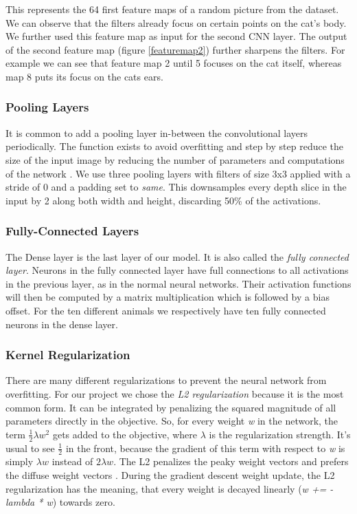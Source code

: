 \documentclass[journal]{IEEEtran}
\begin{document}
This represents the 64 first feature maps of a random picture from the dataset. We can observe that the filters already focus on certain points on the cat's body. We further used this feature map as input for the second CNN layer. The output of the second feature map (figure \ref{featuremap2}) further sharpens the filters. For example we can see that feature map 2 until 5 focuses on the cat itself, whereas map 8 puts its focus on the cats ears. \\

\subsubsection{Pooling Layers}
\noindent It is common to add a pooling layer in-between the convolutional layers periodically. The function exists to avoid overfitting and step by step reduce the size of the input image by reducing the number of parameters and computations of the network \cite{RN2}. We use three pooling layers with filters of size 3x3 applied with a stride of 0 and a padding set to \textit{same}. This downsamples every depth slice in the input by 2 along both width and height, discarding 50\% of the activations. \\
\subsubsection{Fully-Connected Layers}
\noindent The Dense layer is the last layer of our model. It is also called the \textit{fully connected layer}. Neurons in the fully connected layer have full connections to all activations in the previous layer, as in the normal neural networks. Their activation functions will then be computed by a matrix multiplication which is followed by a bias offset. 
For the ten different animals we respectively have ten fully connected neurons in the dense layer. \\
\subsubsection{Kernel Regularization}
\noindent There are many different regularizations to prevent the neural network from overfitting. For our project we chose the \textit{L2 regularization} because it is the most common form.
It can be integrated by penalizing the squared magnitude of all parameters directly in the objective. So, for every weight \textit{w} in the network, the term \(\frac{1}{2} \lambda w^2\) gets added to the objective, where \(\lambda \) is the regularization strength. It's usual to see \(\frac{1}{2}\) in the front, because the gradient of this term with respect to \textit{w} is simply \(\lambda w\) instead of \(2 \lambda w\). The L2 penalizes the peaky weight vectors and prefers the diffuse weight vectors \cite{RN4}. During the gradient descent weight update, the L2 regularization has the meaning, that every weight is decayed linearly (\textit{w += -lambda * w}) towards zero. \\
\end{document}
